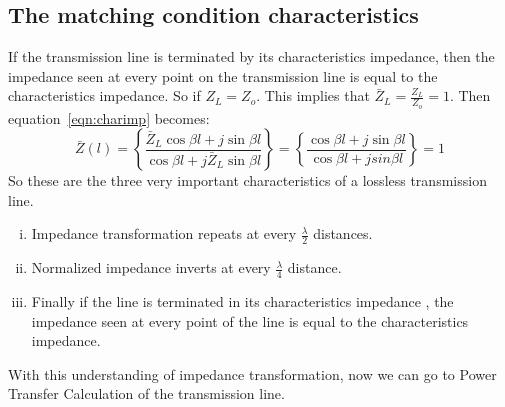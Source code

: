 \subsection{The matching condition characteristics}
If the transmission line is terminated by its characteristics impedance, then the impedance seen at every point on the transmission line is equal to the characteristics impedance. So if $Z_L=Z_o$. This implies that $\bar{Z}_L= \frac{Z_L}{Z_o}=1$. Then equation~\ref{eqn:charimp} becomes:
\begin{dmath*}
\bar{Z}(l) = \left\lbrace\frac{\bar{Z}_L\cos\beta l + j\sin\beta l}{\cos\beta l + j\bar{Z}_L\sin\beta l}\right\rbrace = \left\lbrace \frac{\cos\beta l + j\sin\beta l}{\cos\beta l + jsin\beta l}\right\rbrace = 1
\end{dmath*}
So these are the three very important characteristics of a lossless transmission line.
\begin{enumerate}[(i)]
\item Impedance transformation repeats at every $\frac{\lambda}{2}$ distances.
\item Normalized impedance inverts at every $\frac{\lambda}{4}$ distance.
\item Finally if the line is terminated in its characteristics impedance , the impedance seen at every point of the line is equal to the characteristics impedance.
\end{enumerate}
With this understanding of impedance transformation, now we can go to Power Transfer Calculation of the transmission line.

